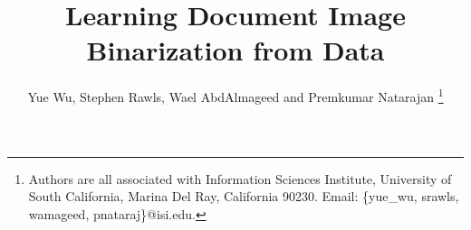\documentclass[onecolumn,11pt,draftcls,journal]{IEEEtran}
\begin{document}



%
\title{Learning Document Image Binarization from Data}
\author{ {Yue Wu, Stephen Rawls, Wael AbdAlmageed and Premkumar Natarajan}
\thanks{ Authors are all associated with Information Sciences Institute, 
University of South California, Marina Del Ray, California 90230. Email: \{yue\_wu, srawls, wamageed, pnataraj\}@isi.edu.}}
%
%
%
%

% 
%
\end{document}
